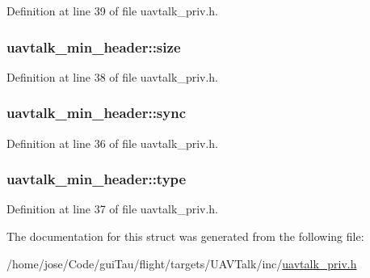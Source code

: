 Definition at line 39 of file uavtalk\-\_\-priv.\-h.

\hypertarget{structuavtalk__min__header_a7f75bcff0b29fb58f7ca4640b5be8eb6}{
\subsubsection[{size}]{ uavtalk\-\_\-min\-\_\-header\-::size}}\label{structuavtalk__min__header_a7f75bcff0b29fb58f7ca4640b5be8eb6}


Definition at line 38 of file uavtalk\-\_\-priv.\-h.

\hypertarget{structuavtalk__min__header_a1f264cf34649646db13e6ce6dbf93ef8}{
\subsubsection[{sync}]{ uavtalk\-\_\-min\-\_\-header\-::sync}}\label{structuavtalk__min__header_a1f264cf34649646db13e6ce6dbf93ef8}


Definition at line 36 of file uavtalk\-\_\-priv.\-h.

\hypertarget{structuavtalk__min__header_a50b5dda063861e09e6275d4cc108bcd8}{
\subsubsection[{type}]{ uavtalk\-\_\-min\-\_\-header\-::type}}\label{structuavtalk__min__header_a50b5dda063861e09e6275d4cc108bcd8}


Definition at line 37 of file uavtalk\-\_\-priv.\-h.



The documentation for this struct was generated from the following file\-:\begin{DoxyCompactItemize}
\item 
/home/jose/\-Code/gui\-Tau/flight/targets/\-U\-A\-V\-Talk/inc/\hyperlink{uavtalk__priv_8h}{uavtalk\-\_\-priv.\-h}\end{DoxyCompactItemize}
